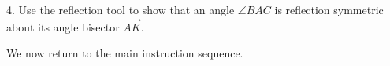 \documentclass{tufte-handout}
\newcommand{\uvx}{\vspace{.2in}}
\begin{document}
\begin{tcolorbox}
\uvx 4. Use the reflection tool to show that an angle $\angle BAC$ is reflection symmetric about its angle bisector $\overrightarrow{AK}$. 
\begin{center}
 \end{center}
 
 \uvx We now return to the main instruction sequence.
 
 
\end{tcolorbox}
\pagebreak
\end{document}
